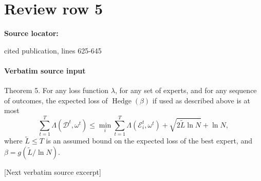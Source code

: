\documentclass[10pt]{article}
\begin{document}
\section*{Review row 5}
\textbf{Source locator:} {\footnotesize\raggedright cited publication, lines 625-\allowbreak{}645\par}
\paragraph{Verbatim source input}
\begin{ReviewVerbatim}
Theorem 5. For any loss function $\lambda$, for any set of experts, and for
any sequence of outcomes, the expected loss of $\operatorname{Hedge}(\beta)$
if used as described above is at most
$$
\sum_{t=1}^T\Lambda(\mathcal D^t,\omega^t)
\leq \min_i\sum_{t=1}^T\Lambda(\mathcal E_i^t,\omega^t)
+\sqrt{2\widetilde L\ln N}+\ln N,
$$
where $\widetilde L\leq T$ is an assumed bound on the expected loss of the
best expert, and $\beta=g(\widetilde L/\ln N)$.

[Next verbatim source excerpt]


\end{ReviewVerbatim}
\end{document}

